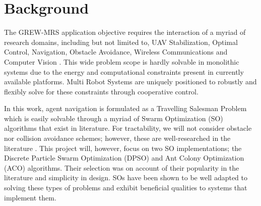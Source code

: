 \documentclass{report}
\begin{document}
\chapter{Background} \label{background}

The GREW-MRS application objective requires the interaction of a myriad of research domains, including but not limited to, UAV Stabilization, Optimal Control, Navigation, Obstacle Avoidance, Wireless Communications and Computer Vision \cite{Guerrero2013}. This wide problem scope is hardly solvable in monolithic systems due to the energy and computational constraints present in currently available platforms. Multi Robot Systems are uniquely positioned to robustly and flexibly solve for these constraints through cooperative control.

In this work, agent navigation is formulated as a Travelling Salesman Problem which is easily solvable through a myriad of Swarm Optimization (SO) algorithms that exist in literature. For tractability, we will not consider obstacle nor collision avoidance schemes; however, these are well-researched in the literature \cite{Galceran2013}. This project will, however, focus on two SO implementations; the Discrete Particle Swarm Optimization (DPSO) and Ant Colony Optimization (ACO) algorithms. Their selection was on account of their popularity in the literature \cite{Tan2013} and simplicity in design. SOs have been shown to be well adapted to solving these types of problems and exhibit beneficial qualities to systems that implement them.
\end{document}
